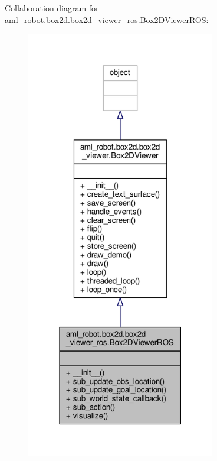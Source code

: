 Collaboration diagram for aml\-\_\-robot.\-box2d.\-box2d\-\_\-viewer\-\_\-ros.\-Box2\-D\-Viewer\-R\-O\-S\-:
\nopagebreak
\begin{figure}[H]
\begin{center}
\leavevmode
\includegraphics[width=234pt]{classaml__robot_1_1box2d_1_1box2d__viewer__ros_1_1_box2_d_viewer_r_o_s__coll__graph}
\end{center}
\end{figure}
